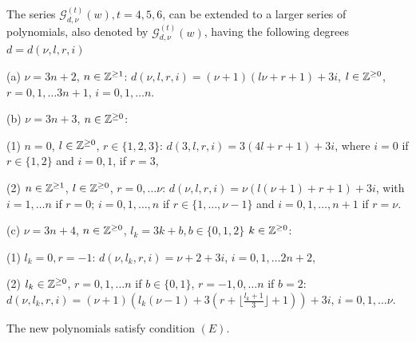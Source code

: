 \documentclass[10pt,a4paper]{amsart}
\begin{document}
          \begin{lem} The series ${\mathcal{G}}^{(t)}_{d,\nu}(w), t=4,5,6$, can be extended to a larger series of polynomials, also denoted by ${\mathcal{G}}^{(t)}_{d,\nu}(w)$, having the following degrees $d=d(\nu, l, r, i)$
       \bigskip\par          
  (a)  $\nu= 3n+2$,  $n \in {\Bbb{Z}}^{\geq 1}$: $d(\nu, l, r, i)=(\nu+1)(l\nu + r+1) + 3i$,  $l \in {\Bbb{Z}}^{\geq 0}$,  $r=0,1,\dots 3n+1$, $i=0,1,\dots n$.
        \bigskip\par 
  (b) $\nu= 3n+3$,  $n \in {\Bbb{Z}}^{\geq 0}$:
  
  (1) $n=0$, $l \in {\Bbb{Z}}^{\geq 0}$, $r \in \{1,2,3\}$: $d(3, l, r, i)= 3(4l+r+1)+3i$, where $i=0$ if $r \in \{1,2\}$ and $i=0,1$, if $r=3$,
  
  (2) $n \in {\Bbb{Z}}^{\geq 1}$, $l \in {\Bbb{Z}}^{\geq 0}$, $r=0, \dots \nu$: $d(\nu, l, r, i)=\nu(l(\nu +1)+r+1)+ 3i$, with  $i=1,\dots n$ if $r=0$;  $i=0,1,\dots, n$ if $r \in \{1, \dots , \nu-1\}$ and $i=0,1,\dots, n+1$ if $r= \nu$.
      \bigskip\par 
  (c) $\nu= 3n+4$,  $n \in {\Bbb{Z}}^{\geq 0}$, $l_{k}=3k+b, b\in \{ 0, 1, 2 \}$ $k \in {\Bbb{Z}}^{\geq 0}$: 
  
  (1)  $l_{k}=0, r=-1$:  $d(\nu, l_{k}, r, i)= \nu +2+3i$, $i=0,1,\dots 2n+2$,
  
  (2) $l_{k}  \in {\Bbb{Z}}^{\geq 0}$, $r=0,1,\dots n$ if $b\in \{ 0, 1 \}$, $r=-1,0,\dots n$ if $b=2$: $d(\nu, l_{k}, r, i)=(\nu +1)(l_{k} (\nu-1)+3(r+\lfloor\frac{l_{k}+1}{3}\rfloor +1))+ 3i$, $i=0,1,\dots \nu$.
          
  The  new polynomials satisfy condition $(E)$.
  \end{lem}
\end{document}

